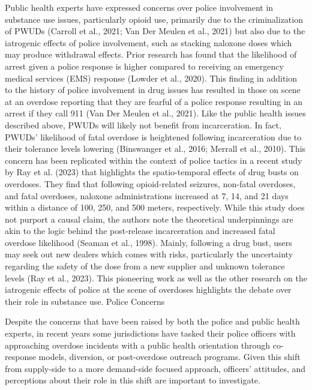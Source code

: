 Public health experts have expressed concerns over police involvement in substance use issues, particularly opioid use, primarily due to the criminalization of PWUDs (Carroll et al., 2021; Van Der Meulen et al., 2021) but also due to the iatrogenic effects of police involvement, such as stacking naloxone doses which may produce withdrawal effects. Prior research has found that the likelihood of arrest given a police response is higher compared to receiving an emergency medical services (EMS) response (Lowder et al., 2020). This finding in addition to the history of police involvement in drug issues has resulted in those on scene at an overdose reporting that they are fearful of a police response resulting in an arrest if they call 911 (Van Der Meulen et al., 2021). Like the public health issues described above, PWUDs will likely not benefit from incarceration. In fact, PWUDs’ likelihood of fatal overdose is heightened following incarceration due to their tolerance levels lowering (Binswanger et al., 2016; Merrall et al., 2010). This concern has been replicated within the context of police tactics in a recent study by Ray et al. (2023) that highlights the spatio-temporal effects of drug busts on overdoses. They find that following opioid-related seizures, non-fatal overdoses, and fatal overdoses, naloxone administrations increased at 7, 14, and 21 days within a distance of 100, 250, and 500 meters, respectively. While this study does not purport a causal claim, the authors note the theoretical underpinnings are akin to the logic behind the post-release incarceration and increased fatal overdose likelihood (Seaman et al., 1998). Mainly, following a drug bust, users may seek out new dealers which comes with risks, particularly the uncertainty regarding the safety of the dose from a new supplier and unknown tolerance levels (Ray et al., 2023). This pioneering work as well as the other research on the iatrogenic effects of police at the scene of overdoses highlights the debate over their role in substance use.
Police Concerns

Despite the concerns that have been raised by both the police and public health experts, in recent years some jurisdictions have tasked their police officers with approaching overdose incidents with a public health orientation through co-response models, diversion, or post-overdose outreach programs. Given this shift from supply-side to a more demand-side focused approach, officers’ attitudes, and perceptions about their role in this shift are important to investigate.

